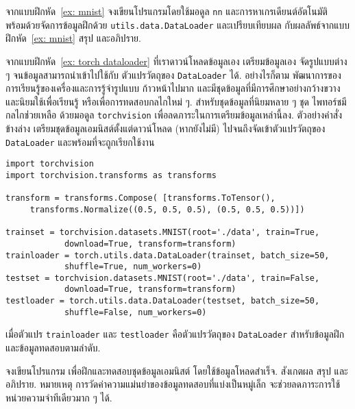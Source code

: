 \begin{Exercise}
	\label{ex: torch dataloader}
	
	จากแบบฝึกหัด~\ref{ex: mnist}
	จงเขียนโปรแกรมโดยใช้มอดูล \texttt{nn} 
	และการหาเกรเดียนต์อัตโนมัติ 
	พร้อมด้วยจัดการข้อมูลฝึกด้วย \texttt{utils.data.DataLoader} 
	และเปรียบเทียบผล กับผลลัพธ์จากแบบฝึกหัด~\ref{ex: mnist} 
	สรุป และอภิปราย.
\end{Exercise}

\begin{Exercise}
	\label{ex: torch dataloader built-in mnist}
	
จากแบบฝึกหัด~\ref{ex: torch dataloader}
ที่เราดาวน์โหลดข้อมูลเอง เตรียมข้อมูลเอง จัดรูปแบบต่าง ๆ จนข้อมูลสามารถนำเข้าไปใช้กับ
ตัวแปรวัตถุของ \verb|DataLoader| ได้.
อย่างไรก็ตาม 
พัฒนาการของการเรียนรู้ของเครื่องและการรู้จำรูปแบบ ก้าวหน้าไปมาก
และมีชุดข้อมูลที่มีการศึกษาอย่างกว้างขวาง และนิยมใช้เพื่อเรียนรู้ หรือเพื่อการทดสอบกลไกใหม่ ๆ.
สำหรับชุดข้อมูลที่นิยมหลาย ๆ ชุด ไพทอร์ชมีกลไกช่่วยเหลือ
ด้วยมอดูล \texttt{torchvision} เพื่อลดภาระในการเตรียมข้อมูลเหล่านี้ลง.
ตัวอย่างคำสั่งข้างล่าง เตรียมชุดข้อมูลเอมนิสต์ตั้งแต่ดาวน์โหลด (หากยังไม่มี)
ไปจนถึงจัดเข้าตัวแปรวัตถุของ \verb|DataLoader| และพร้อมที่จะถูกเรียกใช้งาน
\begin{Verbatim}[fontsize=\small]
import torchvision
import torchvision.transforms as transforms

transform = transforms.Compose( [transforms.ToTensor(),
     transforms.Normalize((0.5, 0.5, 0.5), (0.5, 0.5, 0.5))])

trainset = torchvision.datasets.MNIST(root='./data', train=True,
            download=True, transform=transform)
trainloader = torch.utils.data.DataLoader(trainset, batch_size=50,
            shuffle=True, num_workers=0)
testset = torchvision.datasets.MNIST(root='./data', train=False,
            download=True, transform=transform)
testloader = torch.utils.data.DataLoader(testset, batch_size=50,
            shuffle=False, num_workers=0)
\end{Verbatim}
เมื่อตัวแปร \verb|trainloader| และ \verb|testloader|
คือตัวแปรวัตถุของ \verb|DataLoader| สำหรับข้อมูลฝึกและข้อมูลทดสอบตามลำดับ.

จงเขียนโปรแกรม เพื่อฝึกและทดสอบชุดข้อมูลเอมนิสต์
โดยใช้ข้อมูลโหลดสำเร็จ.
สังเกตผล สรุป และอภิปราย.
หมายเหตุ การวัดค่าความแม่นยำของข้อมูลทดสอบที่แบ่งเป็นหมู่เล็ก จะช่วยลดภาระการใช้หน่วยความจำทีเดียวมาก ๆ ได้.

%
%


\end{Exercise}

